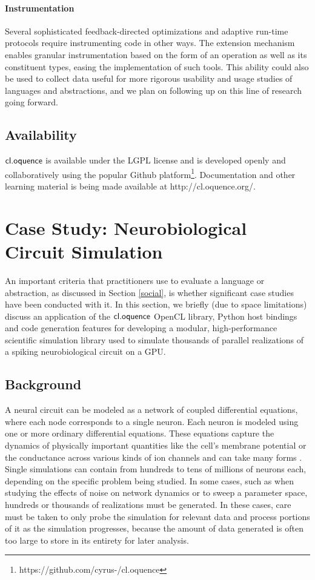 \documentclass[10pt, conference, compsocconf]{IEEEtran}
\begin{document}
\paragraph{Instrumentation}
Several sophisticated feedback-directed optimizations and adaptive run-time protocols require instrumenting code in other ways. The extension mechanism enables granular instrumentation based on the form of an operation as well as its constituent types, easing the implementation of such tools. This ability could also be used to collect data useful for more rigorous usability and usage studies of languages and abstractions, and we plan on following up on this line of research going forward.

\subsection{Availability}
$\textsf{cl.oquence}$ is available under the LGPL license and is developed openly and collaboratively using the popular Github platform\footnote{https://github.com/cyrus-/cl.oquence}. Documentation and other learning material is being made available at http://cl.oquence.org/.

\section{Case Study: Neurobiological Circuit Simulation}
An important criteria that practitioners use to evaluate a language or abstraction, as discussed in Section \ref{social}, is whether significant case studies have been conducted with it. In this section, we briefly (due to space limitations) discuss an application of the $\textsf{cl.oquence}$ OpenCL library, Python host bindings and code generation features for developing a modular, high-performance scientific simulation library used to simulate  thousands of parallel realizations of a spiking neurobiological circuit on a GPU.

\subsection{Background}
A neural circuit can be modeled as a network of coupled differential equations, where each node corresponds to a single neuron. Each neuron is modeled using one or more ordinary differential equations. These equations capture the dynamics of physically important quantities like the cell's membrane potential or the conductance across various kinds of ion channels and can take many forms \cite{neurobook}. Single simulations can contain from hundreds to tens of millions of neurons each, depending on the specific problem being studied. In some cases, such as when studying the effects of noise on network dynamics or to sweep a parameter space, hundreds or thousands of realizations must be generated. In these cases, care must be taken to only probe the simulation for relevant data and process portions of it as the simulation progresses, because the amount of data generated is often too large to store in its entirety for later analysis.
\end{document}
